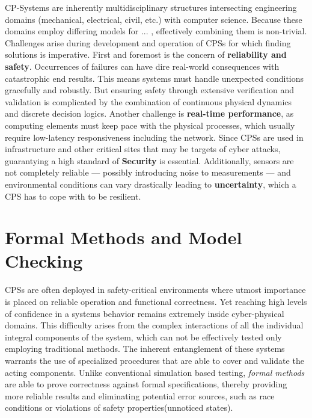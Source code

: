 \documentclass[11pt]{report}
\begin{document}
CP-Systems are inherently multidisciplinary structures intersecting engineering domains (mechanical, electrical, civil, etc.) with computer science.
Because these domains employ differing models for ... , effectively combining them is non-trivial. Challenges arise during development and operation of CPSs for which
finding solutions is imperative. \cite{cpsChallengesAndFuture} First and foremost is the concern of \textbf{reliability and safety}. Occurrences of failures can have dire real-world
consequences with catastrophic end results. This means systems must handle unexpected conditions gracefully and robustly. But ensuring safety through extensive verification 
and validation is complicated by the combination of continuous physical dynamics and discrete decision logics. Another challenge is \textbf{real-time performance}, as computing
elements must keep pace with the physical processes, which usually require low-latency responsiveness including the network. Since CPSs are used in infrastructure and other
critical sites that may be targets of cyber attacks, guarantying a high standard of \textbf{Security} is essential. Additionally, sensors are not completely reliable — 
possibly introducing noise to measurements — and environmental conditions can vary drastically leading to \textbf{uncertainty}, which a CPS has to cope with to be resilient. \cite{cpsProbabilisticRobotics}

\label{sec:formal-methods}
\section{Formal Methods and Model Checking}

CPSs are often deployed in safety-critical environments where utmost importance is placed on reliable operation and functional correctness. Yet reaching high levels of confidence
in a systems behavior remains extremely inside cyber-physical domains.\cite{formalMethodsCPSCritical} This difficulty arises from the complex interactions of all the individual integral 
components of the system, which can not be effectively tested only employing traditional methods. The inherent entanglement of these systems warrants the use of
specialized procedures that are able to cover and validate the acting components. Unlike conventional simulation based testing, \textit{formal methods} are able to prove correctness against
formal specifications, thereby providing more reliable results and eliminating potential error sources, such as race conditions or violations of safety properties(unnoticed states).
\end{document}
